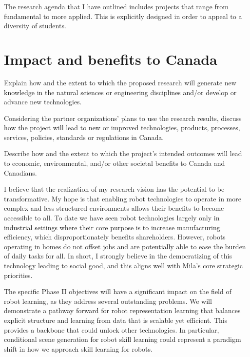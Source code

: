 \documentclass[english,
]{nserc-alliance}
\begin{document}
The research agenda that I have outlined includes projects that range from fundamental to more applied. This is explicitly designed in order to appeal to a diversity of students. 


\section*{Impact and benefits to Canada}
\ifinst\begin{instructions}
  \item Explain how and the extent to which the proposed research will generate new knowledge in the natural sciences or engineering disciplines and/or develop or advance new technologies.
\item Considering the partner organizations' plans to use the research results, discuss how the project will lead to new or improved technologies, products, processes, services, policies, standards or regulations in Canada.
\item Describe how and the extent to which the project's intended outcomes will lead to economic, environmental, and/or other societal benefits to Canada and Canadians.
\end{instructions}\fi


I believe that the realization of my research vision has the potential to be transformative. My hope is that enabling robot technologies to operate in more complex and less structured environments allows their benefits to become accessible to all. To date we have seen robot technologies largely only in industrial settings where their core purpose is to increase manufacturing efficiency, which disproportionately benefits shareholders. However, robots operating in homes do not offset jobs and are potentially able to ease the burden of daily tasks for all. In short, I strongly believe in the democratizing  of this technology leading to social good, and this aligns well with Mila's core strategic priorities.

The specific Phase II objectives will have a significant impact on the field of robot learning, as they address several outstanding problems. We will demonstrate a pathway forward for robot representation learning that balances explicit structure and learning from data that is scalable yet efficient. This provides a backbone that could unlock other technologies. In particular, conditional scene generation  for robot skill learning could represent a paradigm shift in how we approach skill learning for robots. 
\end{document}
